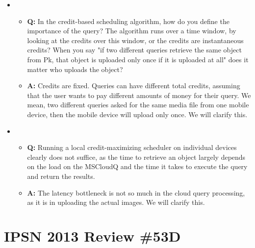 \begin{itemize}
\item
\begin{itemize}
\item \textbf{Q: } In the credit-based scheduling algorithm, how do
  you define the importance of the query? The algorithm runs over a
  time window, by looking at the credits over this window, or the
  credits are instantaneous credits?  When you say "if two different
  queries retrieve the same object from Pk, that object is uploaded
  only once if it is uploaded at all" does it matter who uploads the
  object?
\item \textbf{A: }Credits are fixed. Queries can have different total
  credits, assuming that the user wants to pay different amounts of
  money for their query.  We mean, two different queries asked for the
  same media file from one mobile device, then the mobile device will
  upload only once. We will clarify this.
  \end{itemize}
  
\item
\begin{itemize}
\item \textbf{Q: } Running a local credit-maximizing scheduler on
  individual devices clearly does not suffice, as the time to retrieve
  an object largely depends on the load on the MSCloudQ and the time
  it takes to execute the query and return the results.
\item \textbf{A: } The latency bottleneck is not so much in the cloud
  query processing, as it is in uploading the actual images. We will
  clarify this.
 \end{itemize}
 \end{itemize}
\section{IPSN 2013 Review \#53D}

